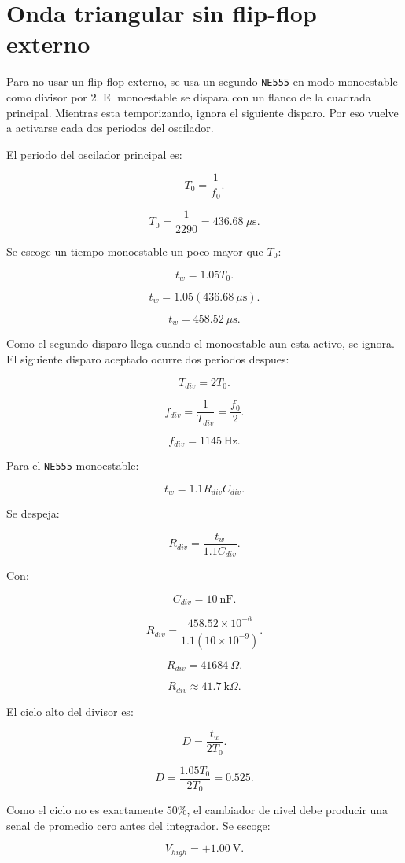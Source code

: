 \documentclass[11pt,letterpaper]{article}
\begin{document}
\section{Onda triangular sin flip-flop externo}

Para no usar un flip-flop externo, se usa un segundo \texttt{NE555} en modo
monoestable como divisor por 2. El monoestable se dispara con un flanco de la
cuadrada principal. Mientras esta temporizando, ignora el siguiente disparo.
Por eso vuelve a activarse cada dos periodos del oscilador.

El periodo del oscilador principal es:

\[
T_0=\frac{1}{f_0}.
\]

\[
T_0=\frac{1}{2290}=436.68~\mu\text{s}.
\]

Se escoge un tiempo monoestable un poco mayor que \(T_0\):

\[
t_w=1.05T_0.
\]

\[
t_w=1.05(436.68~\mu\text{s}).
\]

\[
t_w=458.52~\mu\text{s}.
\]

Como el segundo disparo llega cuando el monoestable aun esta activo, se ignora.
El siguiente disparo aceptado ocurre dos periodos despues:

\[
T_{div}=2T_0.
\]

\[
f_{div}=\frac{1}{T_{div}}=\frac{f_0}{2}.
\]

\[
\boxed{f_{div}=1145~\text{Hz}}.
\]

Para el \texttt{NE555} monoestable:

\[
t_w=1.1R_{div}C_{div}.
\]

Se despeja:

\[
R_{div}=\frac{t_w}{1.1C_{div}}.
\]

Con:

\[
C_{div}=10~\text{nF}.
\]

\[
R_{div}=
\frac{458.52\times10^{-6}}
{1.1(10\times10^{-9})}.
\]

\[
R_{div}=41684~\Omega.
\]

\[
\boxed{R_{div}\approx41.7~\text{k}\Omega}.
\]

El ciclo alto del divisor es:

\[
D=\frac{t_w}{2T_0}.
\]

\[
D=\frac{1.05T_0}{2T_0}=0.525.
\]

Como el ciclo no es exactamente \(50\%\), el cambiador de nivel debe producir
una senal de promedio cero antes del integrador. Se escoge:

\[
V_{high}=+1.00~\text{V}.
\]
\end{document}
